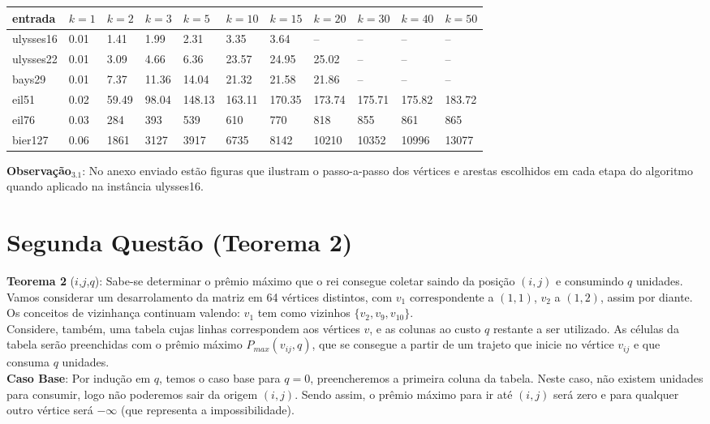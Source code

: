 \documentclass{article}
\begin{document}
\begin{table}[H]
\centering
\begin{tabular}{l|l|l|l|l|l|l|l|l|l|l}
entrada & $k=1$ & $k=2$ & $k=3$ & $k=5$ & $k=10$ & $k=15$ & $k=20$ & $k=30$ & $k=40$ & $k=50$ \\\hline
ulysses16 & 0.01 & 1.41 & 1.99 & 2.31 & 3.35 & 3.64 & -- & -- & -- & -- \\
ulysses22 & 0.01 & 3.09 & 4.66 & 6.36 & 23.57 & 24.95 & 25.02 & -- & -- & -- \\
bays29 & 0.01 & 7.37 & 11.36 & 14.04 & 21.32 & 21.58 & 21.86 & -- & -- & -- \\
eil51 & 0.02 & 59.49 & 98.04 & 148.13 & 163.11 & 170.35 & 173.74 & 175.71 & 175.82 & 183.72 \\
eil76 & 0.03 & 284 & 393 & 539 & 610 & 770 & 818 & 855 & 861 & 865 \\
bier127 & 0.06 & 1861 & 3127 & 3917 & 6735 & 8142 & 10210 & 10352 & 10996 & 13077
\end{tabular}
\end{table}

\textbf{Observação$_3.1$}: No anexo enviado estão figuras que ilustram o passo-a-passo dos vértices e arestas escolhidos em cada etapa do algoritmo quando aplicado na instância ulysses16.

\pagebreak

\section{Segunda Questão (Teorema 2)}

\textbf{Teorema 2} ($i$,$j$,$q$): Sabe-se determinar o prêmio máximo que o rei consegue coletar saindo da posição $(i,j)$ e consumindo $q$ unidades.\\

Vamos considerar um desarrolamento da matriz em 64 vértices distintos, com $v_1$ correspondente a $(1,1)$, $v_2$ a $(1,2)$, assim por diante. Os conceitos de vizinhança continuam valendo: $v_1$ tem como vizinhos $\{v_2, v_9, v_10\}$.\\

Considere, também, uma tabela cujas linhas correspondem aos vértices $v$, e as colunas ao custo $q$ restante a ser utilizado. As células da tabela serão preenchidas com o prêmio máximo $P_{max}(v_{ij},q)$, que se consegue a partir de um trajeto que inicie no vértice $v_{ij}$ e que consuma $q$ unidades.\\

\textbf{Caso Base}: Por indução em $q$, temos o caso base para $q = 0$, preencheremos a primeira coluna da tabela. Neste caso, não existem unidades para consumir, logo não poderemos sair da origem $(i,j)$. Sendo assim, o prêmio máximo para ir até $(i,j)$ será zero e para qualquer outro vértice será $-\infty$ (que representa a impossibilidade).\\
\end{document}
